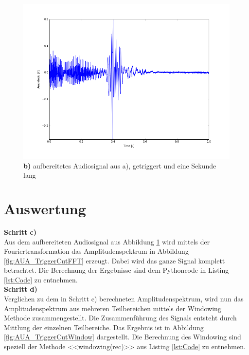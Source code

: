 \documentclass[12pt,oneside,a4paper]{report}
\begin{document}
\begin{figure}[H]
\centering\small
\includegraphics [scale=0.45]{src/Aufnahme1TriggerCut.png}
\caption{ \textbf{b)} aufbereitetes Audiosignal aus a), getriggert und eine Sekunde lang}
\label{fig:AUA_TriggerCut}
\end{figure}


\section{Auswertung}
\label{chap:VERSUCH_1_AUSWERTUNG}
\textbf{Schritt c)}\\
Aus dem aufbereiteten Audiosignal aus Abbildung \ref{fig:AUA_TriggerCut} wird mittels der Fouriertransformation das Amplitudenspektrum in Abbildung \ref{fig:AUA_TriggerCutFFT} erzeugt. Dabei wird das ganze Signal komplett betrachtet. Die Berechnung der Ergebnisse sind dem Pythoncode in Listing \ref{lst:Code} zu entnehmen.\\
\textbf{Schritt d)}\\
Verglichen zu dem in Schritt c) berechneten Amplitudenspektrum, wird nun das Amplitudenspektrum aus mehreren Teilbereichen mittels der Windowing Methode zusammengestellt. Die Zusammenführung des Signals entsteht durch Mittlung der einzelnen Teilbereiche. Das Ergebnis ist in Abbildung \ref{fig:AUA_TriggerCutWindow} dargestellt.
Die Berechnung des Windowing sind speziell der Methode <<windowing(rec)>> aus Listing \ref{lst:Code} zu entnehmen.
\end{document}
